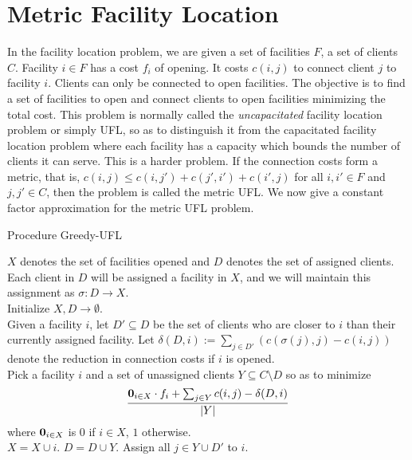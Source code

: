 \documentclass[11pt]{article}
\newlength{\algobox}
\begin{document}
\section{Metric Facility Location}
In the facility location problem, we are given a set of facilities $F$, a set of clients $C$. Facility $i\in F$ has a cost $f_i$ of opening. It costs $c(i,j)$ to connect client $j$ to facility $i$. Clients can only be connected to open facilities. The objective is to find a set of facilities to open and connect clients to open facilities minimizing the total cost. This problem is normally called the {\em uncapacitated} facility location problem or simply UFL,
so as to distinguish it from the capacitated facility location problem where each facility has a capacity which bounds the number of clients it can serve. This is a harder problem.
If the connection costs form a metric, that is, $c(i,j) \le c(i,j') + c(j',i') + c(i',j)$ for all $i,i'\in F$ and $j,j'\in C$, 
then the problem is called the metric UFL. We now give a constant factor approximation for the metric UFL problem.


\vspace{2ex}\noindent
\begin{boxedminipage}{\algobox}
Procedure {\sc Greedy-UFL}
\begin{algorithmic}[1]
  \STATE $X$ denotes the set of facilities opened and $D$ denotes the set of assigned clients. 
               Each client in $D$ will be assigned a facility in $X$, and we will maintain this assignment 
               as $\sigma : D\to X$. \\
  \STATE Initialize $X,D \to \emptyset$. \\
  	\STATE  Given a facility $i$, let $D'\subseteq D$ be the set of clients who are closer to $i$ than their
	              currently assigned facility. Let $\delta(D,i) := \sum_{j\in D'}(c(\sigma(j),j) - c(i,j))$ denote the 
	              reduction in connection costs if $i$ is opened. \\
	\STATE  Pick a facility $i$ and a set of unassigned clients $Y\subseteq C\setminus D$ so as to minimize
	 		$$ \frac{{\bf 0}_{i\in X}\cdot f_i + \sum_{j\in Y} c(i,j) - \delta(D,i)}{|Y|}$$
		      where ${\bf 0}_{i\in X}$ is $0$ if $i\in X$, $1$ otherwise. 
	 \\
	\STATE $X = X \cup i$. $D = D\cup Y$. Assign all $j\in Y\cup D'$ to $i$.
  \ENDWHILE
\end{algorithmic}
\end{boxedminipage}
\vspace{1ex}
\def\i{{i^*}}
\end{document}
